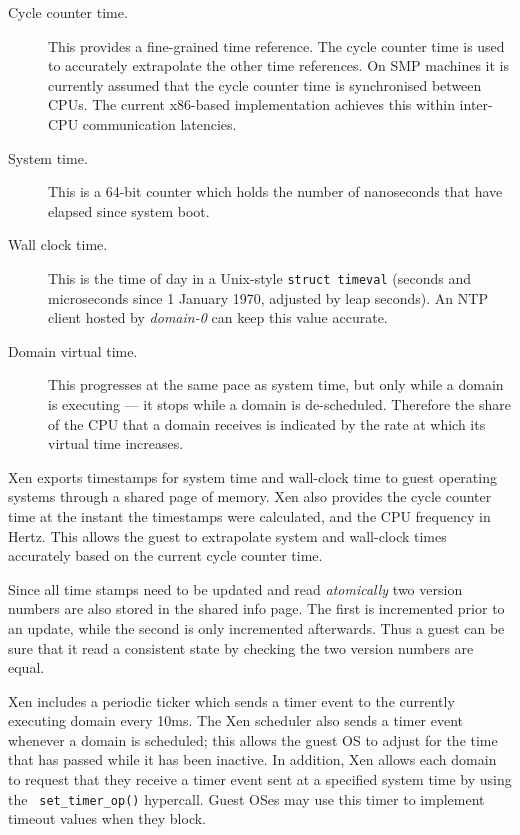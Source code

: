 \documentclass[11pt,twoside,final,openright]{xenstyle}
\begin{document}
\begin{description}
\item[Cycle counter time.]

This provides a fine-grained time reference.  The cycle counter time is
used to accurately extrapolate the other time references.  On SMP machines
it is currently assumed that the cycle counter time is synchronised between
CPUs.  The current x86-based implementation achieves this within inter-CPU
communication latencies.

\item[System time.]

This is a 64-bit counter which holds the number of nanoseconds that
have elapsed since system boot.


\item[Wall clock time.]

This is the time of day in a Unix-style {\tt struct timeval} (seconds
and microseconds since 1 January 1970, adjusted by leap seconds).  An
NTP client hosted by {\it domain-0} can keep this value accurate.  


\item[Domain virtual time.]

This progresses at the same pace as system time, but only while a
domain is executing --- it stops while a domain is de-scheduled.
Therefore the share of the CPU that a domain receives is indicated by
the rate at which its virtual time increases.

\end{description}


Xen exports timestamps for system time and wall-clock time to guest
operating systems through a shared page of memory.  Xen also provides
the cycle counter time at the instant the timestamps were calculated,
and the CPU frequency in Hertz.  This allows the guest to extrapolate
system and wall-clock times accurately based on the current cycle
counter time.

Since all time stamps need to be updated and read \emph{atomically}
two version numbers are also stored in the shared info page. The 
first is incremented prior to an update, while the second is only
incremented afterwards. Thus a guest can be sure that it read a consistent 
state by checking the two version numbers are equal. 

Xen includes a periodic ticker which sends a timer event to the
currently executing domain every 10ms.  The Xen scheduler also sends a
timer event whenever a domain is scheduled; this allows the guest OS
to adjust for the time that has passed while it has been inactive.  In
addition, Xen allows each domain to request that they receive a timer
event sent at a specified system time by using the {\tt
set\_timer\_op()} hypercall.  Guest OSes may use this timer to
implement timeout values when they block.
\end{document}
